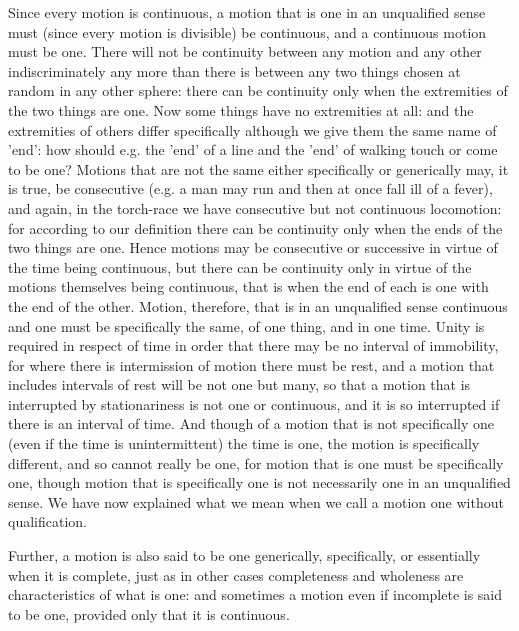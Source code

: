 Since every motion is continuous, a motion that is one in an unqualified
sense must (since every motion is divisible) be continuous, and a
continuous motion must be one. There will not be continuity between
any motion and any other indiscriminately any more than there is between
any two things chosen at random in any other sphere: there can be
continuity only when the extremities of the two things are one. Now
some things have no extremities at all: and the extremities of others
differ specifically although we give them the same name of 'end':
how should e.g. the 'end' of a line and the 'end' of walking touch
or come to be one? Motions that are not the same either specifically
or generically may, it is true, be consecutive (e.g. a man may run
and then at once fall ill of a fever), and again, in the torch-race
we have consecutive but not continuous locomotion: for according to
our definition there can be continuity only when the ends of the two
things are one. Hence motions may be consecutive or successive in
virtue of the time being continuous, but there can be continuity only
in virtue of the motions themselves being continuous, that is when
the end of each is one with the end of the other. Motion, therefore,
that is in an unqualified sense continuous and one must be specifically
the same, of one thing, and in one time. Unity is required in respect
of time in order that there may be no interval of immobility, for
where there is intermission of motion there must be rest, and a motion
that includes intervals of rest will be not one but many, so that
a motion that is interrupted by stationariness is not one or continuous,
and it is so interrupted if there is an interval of time. And though
of a motion that is not specifically one (even if the time is unintermittent)
the time is one, the motion is specifically different, and so cannot
really be one, for motion that is one must be specifically one, though
motion that is specifically one is not necessarily one in an unqualified
sense. We have now explained what we mean when we call a motion one
without qualification. 

Further, a motion is also said to be one generically, specifically,
or essentially when it is complete, just as in other cases completeness
and wholeness are characteristics of what is one: and sometimes a
motion even if incomplete is said to be one, provided only that it
is continuous. 

